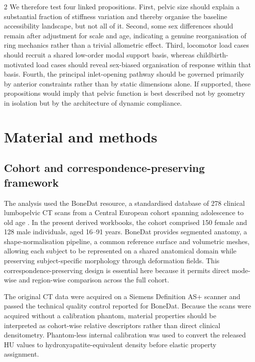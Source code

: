 \documentclass[openacc]{rsproca_new}
\begin{document}
\begin{multicols}{2}
We therefore test four linked propositions. First, pelvic size should explain a substantial fraction of stiffness variation and thereby organise the baseline accessibility landscape, but not all of it. Second, some sex differences should remain after adjustment for scale and age, indicating a genuine reorganisation of ring mechanics rather than a trivial allometric effect. Third, locomotor load cases should recruit a shared low-order modal support basis, whereas childbirth-motivated load cases should reveal sex-biased organisation of response within that basis. Fourth, the principal inlet-opening pathway should be governed primarily by anterior constraints rather than by static dimensions alone. If supported, these propositions would imply that pelvic function is best described not by geometry in isolation but by the architecture of dynamic compliance.

\section{Material and methods}

\subsection{Cohort and correspondence-preserving framework}

The analysis used the BoneDat resource, a standardised database of 278 clinical lumbopelvic CT scans from a Central European cohort spanning adolescence to old age \cite{HenysKuchar2025}. In the present derived workbooks, the cohort comprised 150 female and 128 male individuals, aged 16--91 years. BoneDat provides segmented anatomy, a shape-normalisation pipeline, a common reference surface and volumetric meshes, allowing each subject to be represented on a shared anatomical domain while preserving subject-specific morphology through deformation fields. This correspondence-preserving design is essential here because it permits direct mode-wise and region-wise comparison across the full cohort.

The original CT data were acquired on a Siemens Definition AS+ scanner and passed the technical quality control reported for BoneDat. Because the scans were acquired without a calibration phantom, material properties should be interpreted as cohort-wise relative descriptors rather than direct clinical densitometry. Phantom-less internal calibration was used to convert the released HU values to hydroxyapatite-equivalent density before elastic property assignment.


\end{multicols}
\end{document}

